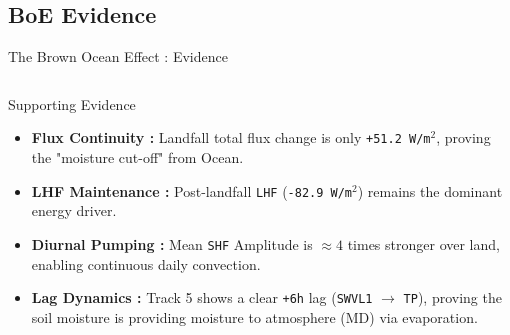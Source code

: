 \documentclass[8pt, aspectratio=169]{beamer}
\begin{document}
\subsection{BoE Evidence}
\begin{frame}{The Brown Ocean Effect : Evidence}
    \vspace{-0.3cm}
    \footnotesize
    \begin{columns}[T]
        \begin{block}{Supporting Evidence}
            \begin{itemize}
                \item \textbf{Flux Continuity :} Landfall total flux change is only \texttt{+51.2 W/m$^2$}, proving the "moisture cut-off" from Ocean.
                \item \textbf{LHF Maintenance :} Post-landfall \texttt{LHF} (\texttt{-82.9 W/m$^2$}) remains the dominant energy driver.
                \item \textbf{Diurnal Pumping :} Mean \texttt{SHF} Amplitude is $\approx 4$ times stronger over land, enabling continuous daily convection.
                \item \textbf{Lag Dynamics :} Track 5 shows a clear \texttt{+6h} lag (\texttt{SWVL1} $\rightarrow$ \texttt{TP}), proving the soil moisture is providing moisture to atmosphere (MD) via evaporation.
            \end{itemize}
        \end{block}


\end{columns}
\end{frame}
\end{document}
